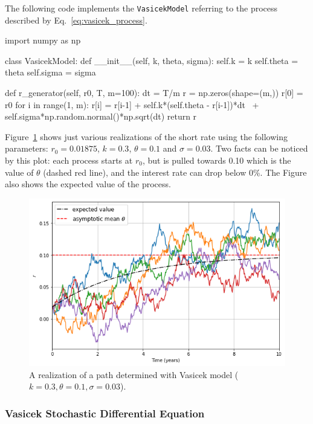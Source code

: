 \begin{finmarkets}
The following code implements the \texttt{VasicekModel} referring to the process described by Eq.~\ref{eq:vasicek_process}.
\end{finmarkets}

\begin{ipython}
import numpy as np

class VasicekModel:
    def __init__(self, k, theta, sigma):
        self.k = k
        self.theta = theta
        self.sigma = sigma

    def r_generator(self, r0, T, m=100):
        dt = T/m
        r = np.zeros(shape=(m,))
        r[0] = r0
        for i in range(1, m):
            r[i] = r[i-1] + self.k*(self.theta - r[i-1])*dt \   
                   + self.sigma*np.random.normal()*np.sqrt(dt)
        return r
\end{ipython}

Figure~\ref{fig:vasicek_path} shows just various realizations of the short rate using the following parameters: $r_0=0.01875$, $k=0.3$, $\theta=0.1$ and $\sigma=0.03$. 
Two facts can be noticed by this plot: each process starts at $r_0$, but is pulled towards 0.10 which is the value of $\theta$ (dashed red line), and the interest rate can drop below 0\%. The Figure also shows the expected value of the process.

\begin{figure}[htb]
    \centering
    \includegraphics[width=0.7\linewidth]{figures/vasicek_short_rate}
    \caption{A realization of a path determined with Vasicek model ($k=0.3, \theta=0.1, \sigma=0.03$).}
	\label{fig:vasicek_path}
\end{figure}

\subsubsection{Vasicek Stochastic Differential Equation}
\label{vasicek-stochastic-differential-equation}

